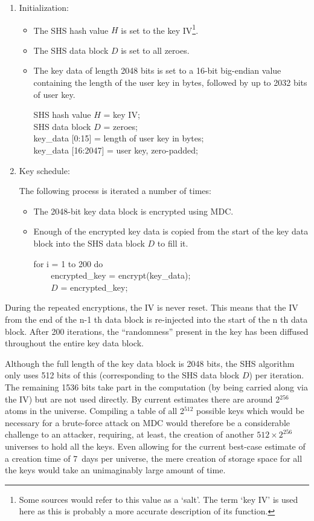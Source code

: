 \begin{enumerate}

\item Initialization:

 \begin{itemize}
 \item The SHS hash value $H$ is set to the key IV\footnote{
              Some sources would refer to this value as a `salt'.  The term
              `key IV' is used here as this is probably a more accurate
              description of its function.
 }.
 \item The SHS data block $D$ is set to all zeroes.
 \item The key data of length 2048 bits is set to a 16-bit big-endian value
   containing the length of the user key in bytes, followed by up to 2032 bits
   of user key.

   SHS hash value $H$ = key IV;\\
   SHS data block $D$ = zeroes;\\
   key\_data [0:15] = length of user key in bytes;\\
   key\_data [16:2047] = user key, zero-padded;
 \end{itemize}

\item Key schedule:

 The following process is iterated a number of times:

   \begin{itemize}
   \item The 2048-bit key data block is encrypted using MDC.
   \item Enough of the encrypted key data is copied from the start of the key data
     block into the SHS data block $D$ to fill it.

   for i = 1 to 200 do\\
\verb|    |encrypted\_key = encrypt(key\_data);\\
\verb|    |$D$ = encrypted\_key;
   \end{itemize}
\end{enumerate}

During the repeated encryptions, the IV is never reset.  This means that the IV
from the end of the n-1 th data block is re-injected into the start of the n th
data block.  After 200 iterations, the ``randomness'' present in the key has been
diffused throughout the entire key data block.

Although the full length of the key data block is 2048 bits, the SHS algorithm
only uses 512 bits of this (corresponding to the SHS data block $D$) per
iteration.  The remaining 1536 bits take part in the computation (by being
carried along via the IV) but are not used directly.  By current estimates
there are around 2$^{256}$ atoms in the universe.  Compiling a table of all 2$^{512}$
possible keys which would be necessary for a brute-force attack on MDC would
therefore be a considerable challenge to an attacker, requiring, at least, the
creation of another $512 \times 2^{256}$ universes to hold all the keys.  Even allowing
for the current best-case estimate of a creation time of 7~days per universe,
the mere creation of storage space for all the keys would take an unimaginably
large amount of time.

